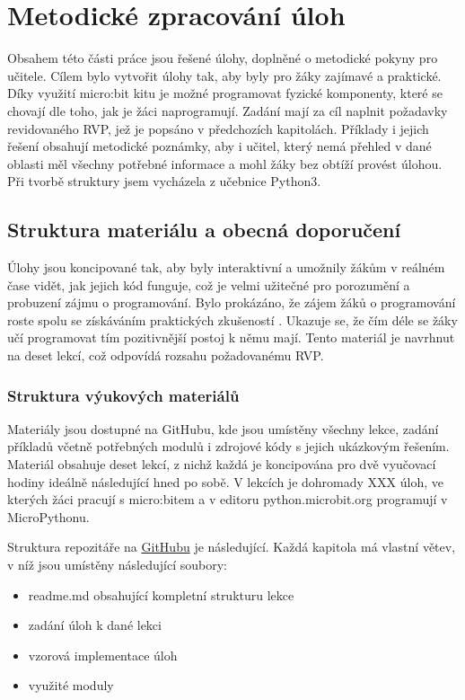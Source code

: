 \documentclass[
  digital,     %
  oneside,     %
  nosansbold,  %
  colorbold, %
  lof,         %
  nolot,         %
]{fithesis4}
\begin{document}
\chapter{Metodické zpracování úloh}
Obsahem této části práce jsou řešené úlohy, doplněné o metodické pokyny pro učitele. Cílem bylo vytvořit úlohy tak, aby byly pro žáky zajímavé a praktické. Díky využití micro:bit kitu je možné programovat fyzické komponenty, které se chovají dle toho, jak je žáci naprogramují. Zadání mají za cíl naplnit požadavky revidovaného RVP, jež je popsáno v předchozích kapitolách. Příklady i jejich řešení obsahují metodické poznámky, aby i učitel, který nemá přehled v dané oblasti měl všechny potřebné informace a mohl žáky bez obtíží provést úlohou. Při tvorbě struktury jsem vycházela z učebnice Python3. %

\section{Struktura materiálu a obecná doporučení}
Úlohy jsou koncipované tak, aby byly interaktivní a umožnily žákům v reálném čase vidět, jak jejich kód funguje, což je velmi užitečné pro porozumění a probuzení zájmu o programování. Bylo prokázáno, že zájem žáků o programování roste spolu se získáváním praktických zkušeností \cite{Fagerlund22}. Ukazuje se, že čím déle se žáky učí programovat tím pozitivnější postoj k němu mají. Tento materiál je navrhnut na deset lekcí, což odpovídá rozsahu požadovanému RVP.

\subsection{Struktura výukových materiálů} %

Materiály jsou dostupné na GitHubu, kde jsou umístěny všechny lekce, zadání příkladů včetně potřebných modulů i zdrojové kódy s jejich ukázkovým řešením. Materiál obsahuje deset lekcí, z nichž každá je koncipována pro dvě vyučovací hodiny ideálně následující hned po sobě. V lekcích je dohromady XXX %
úloh, ve kterých žáci pracují s micro:bitem a v editoru python.microbit.org programují v MicroPythonu.

Struktura repozitáře na \href{https://github.com/denisa-mat/BP-microbit}{GitHubu} je následující. Každá kapitola má vlastní větev, v níž jsou umístěny následující soubory:
\begin{itemize}
    \item readme.md obsahující kompletní strukturu lekce
    \item zadání úloh k dané lekci
    \item vzorová implementace úloh
    \item využité moduly
\end{itemize}
\end{document}
